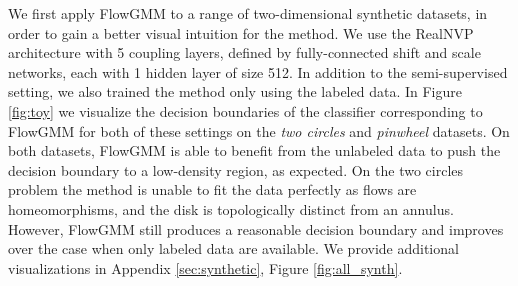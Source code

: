\documentclass{article}
\newcommand{\method}{FlowGMM\xspace}
\begin{document}
We first apply \method to a range of two-dimensional synthetic datasets, 
in order to gain a better visual intuition for the method.
We use the RealNVP architecture with 5 coupling layers, defined 
by fully-connected shift and scale networks, each with 1 hidden 
layer of size 512.
In addition to the semi-supervised setting, we also trained the method only using the labeled data.
In Figure \ref{fig:toy} we visualize the decision boundaries of the classifier corresponding to \method for both of these settings on the \textit{two circles} and \textit{pinwheel} datasets. 
On both datasets, \method is able to benefit from the unlabeled data to push the decision boundary to a low-density region, as expected.
On the two circles problem the method is unable to fit the data perfectly as flows are homeomorphisms, and the disk is topologically distinct from an annulus.
However, \method still produces a reasonable decision boundary and improves over the case when only labeled data are available.
We provide additional visualizations in Appendix \ref{sec:synthetic},
Figure \ref{fig:all_synth}. 
\end{document}
